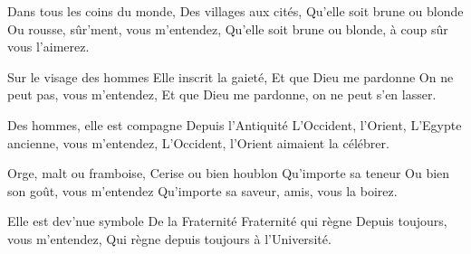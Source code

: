 \footnotemark [
ititle={Femmes ou la bière, les},
tu={La complainte de Mandrin (trad.)}]


\beginverse
Dans tous les coins du monde,
Des villages aux cités,
Qu'elle soit brune ou blonde
Ou rousse, sûr'ment, vous m'entendez,
Qu'elle soit brune ou blonde, à coup sûr vous l'aimerez.
\endverse

\beginverse
Sur le visage des hommes
Elle inscrit la gaieté,
Et que Dieu me pardonne
On ne peut pas, vous m'entendez,
Et que Dieu me pardonne, on ne peut s'en lasser.
\endverse

\beginverse
Des hommes, elle est compagne
Depuis l'Antiquité
L'Occident, l'Orient,
L'Egypte ancienne, vous m'entendez,
L'Occident, l'Orient aimaient la célébrer.
\endverse

\beginverse
Orge, malt ou framboise,
Cerise ou bien houblon
Qu'importe sa teneur
Ou bien son goût, vous m'entendez
Qu'importe sa saveur, amis, vous la boirez.
\endverse

\beginverse
Elle est dev'nue symbole
De la Fraternité
Fraternité qui règne
Depuis toujours, vous m'entendez,
Qui règne depuis toujours à l'Université.
\endverse
\endsong